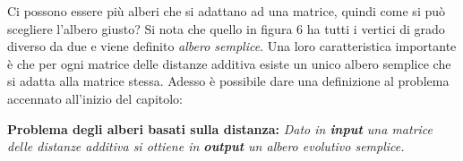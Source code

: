 \newline
Ci possono essere più alberi che si adattano ad una matrice, quindi come si può scegliere l'albero giusto? Si nota che quello in figura 6 ha tutti i vertici di grado diverso da due e viene definito \textit{albero semplice}. 
\newpage
Una loro caratteristica importante è che per ogni matrice delle distanze additiva esiste un unico albero semplice che si adatta alla matrice stessa.
\newline
Adesso è possibile dare una definizione al problema accennato all'inizio del capitolo:
\begin{center}
\textbf{Problema degli alberi basati sulla distanza:}
\newline
\textit{Dato in \textbf{input} una matrice delle distanze additiva si ottiene in \textbf{output} un albero evolutivo semplice.}
\end{center}

